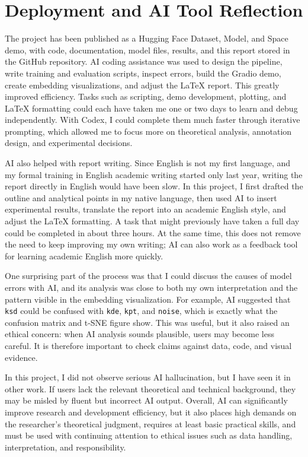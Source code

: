 \documentclass[11pt,a4paper]{article}
\begin{document}
\section{Deployment and AI Tool Reflection}

The project has been published as a Hugging Face Dataset, Model, and Space demo, with code, documentation, model files, results, and this report stored in the GitHub repository. AI coding assistance was used to design the pipeline, write training and evaluation scripts, inspect errors, build the Gradio demo, create embedding visualizations, and adjust the \LaTeX{} report. This greatly improved efficiency. Tasks such as scripting, demo development, plotting, and \LaTeX{} formatting could each have taken me one or two days to learn and debug independently. With Codex, I could complete them much faster through iterative prompting, which allowed me to focus more on theoretical analysis, annotation design, and experimental decisions.

AI also helped with report writing. Since English is not my first language, and my formal training in English academic writing started only last year, writing the report directly in English would have been slow. In this project, I first drafted the outline and analytical points in my native language, then used AI to insert experimental results, translate the report into an academic English style, and adjust the \LaTeX{} formatting. A task that might previously have taken a full day could be completed in about three hours. At the same time, this does not remove the need to keep improving my own writing; AI can also work as a feedback tool for learning academic English more quickly.

One surprising part of the process was that I could discuss the causes of model errors with AI, and its analysis was close to both my own interpretation and the pattern visible in the embedding visualization. For example, AI suggested that \texttt{ksd} could be confused with \texttt{kde}, \texttt{kpt}, and \texttt{noise}, which is exactly what the confusion matrix and t-SNE figure show. This was useful, but it also raised an ethical concern: when AI analysis sounds plausible, users may become less careful. It is therefore important to check claims against data, code, and visual evidence.

In this project, I did not observe serious AI hallucination, but I have seen it in other work. If users lack the relevant theoretical and technical background, they may be misled by fluent but incorrect AI output. Overall, AI can significantly improve research and development efficiency, but it also places high demands on the researcher's theoretical judgment, requires at least basic practical skills, and must be used with continuing attention to ethical issues such as data handling, interpretation, and responsibility.
\end{document}
